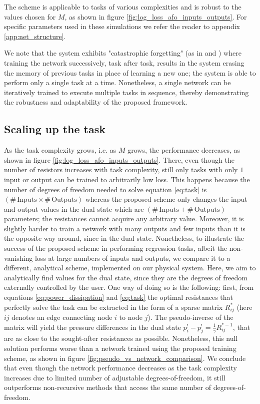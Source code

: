 \documentclass[%
 reprint,
 amsmath,amssymb,
 aps,
]{revtex4-2}
\begin{document}
    The scheme is applicable to tasks of various complexities and is robust to the values chosen for $M$, as shown in figure \ref{fig:log_loss_afo_inputs_outputs}. For specific parameters used in these simulations we refer the reader to appendix \ref{app:net_structure}.
    
    We note that the system exhibits "catastrophic forgetting" (as in \cite{FRENCH1999128} and \cite{stern2020continual}) where training the network successively, task after task, results in the system erasing the memory of previous tasks in place of learning a new one; the system is able to perform only a single task at a time. Nonetheless, a single network can be iteratively trained to execute multiple tasks in sequence, thereby demonstrating the robustness and adaptability of the proposed framework.

\subsection{Scaling up the task}\label{sec:scaling_up}

    As the task complexity grows, i.e. as $M$ grows, the performance decreases, as shown in figure \ref{fig:log_loss_afo_inputs_outputs}. There, even though the number of resistors increases with task complexity, still only tasks with only $1$ input or output can be trained to arbitrarily low loss. This happens because the number of degrees of freedom needed to solve equation \ref{eq:task} is $\left(\# \, \text{Inputs}\times \# \, \text{Outputs}\right)$ whereas the proposed scheme only changes the input and output values in the dual state which are $\left(\# \, \text{Inputs}+\# \, \text{Outputs}\right)$ parameters; the resistances cannot acquire any arbitrary value. \textcolor{roie}{Moreover, it is slightly harder to train a network with many outputs and few inputs than it is the opposite way around, since in the dual state.} 
    Nonetheless, to illustrate the success of the proposed scheme in performing regression tasks, albeit the non-vanishing loss at large numbers of inputs and outputs, we compare it to a different, analytical scheme, implemented on our physical system. Here, we aim to analytically find values for the dual state, since they are the degrees of freedom externally controlled by the user. One way of doing so is the following: first, from equations \ref{eq:power_dissipation} and \ref{eq:task} the optimal resistances that perfectly solve the task can be extracted in the form of a sparse matrix $R_{ij}^*$ (here $ij$ denotes an edge connecting node $i$ to node $j$). The pseudo-inverse of the matrix will yield the pressure differences in the dual state $p_i^!-p_j^!=\frac{1}{\gamma}R_{ij}^{*-1}$, that are as close to the sought-after resistances as possible. 
    Nonetheless, this null solution performs worse than a network trained using the proposed training scheme, as shown in figure \ref{fig:pseudo_vs_network_comparison}. 
    We conclude that even though the network performance decreases as the task complexity increases due to limited number of adjustable degrees-of-freedom, it still outperforms non-recursive methods that access the same number of degrees-of-freedom.
\end{document}
